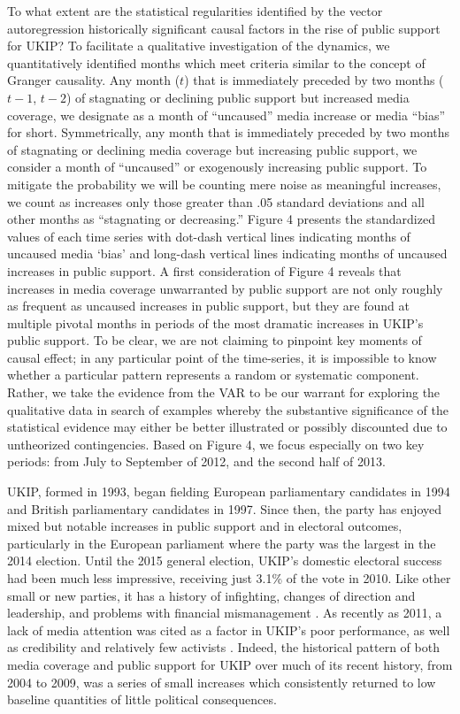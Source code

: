 \documentclass[12pt,]{article}
\begin{document}
To what extent are the statistical regularities identified by the vector
autoregression historically significant causal factors in the rise of
public support for UKIP? To facilitate a qualitative investigation of
the dynamics, we quantitatively identified months which meet criteria
similar to the concept of Granger causality. Any month (\(t\)) that is
immediately preceded by two months (\(t-1\), \(t-2\)) of stagnating or
declining public support but increased media coverage, we designate as a
month of ``uncaused'' media increase or media ``bias'' for short.
Symmetrically, any month that is immediately preceded by two months of
stagnating or declining media coverage but increasing public support, we
consider a month of ``uncaused'' or exogenously increasing public
support. To mitigate the probability we will be counting mere noise as
meaningful increases, we count as increases only those greater than .05
standard deviations and all other months as ``stagnating or
decreasing.'' Figure 4 presents the standardized values of each time
series with dot-dash vertical lines indicating months of uncaused media
`bias' and long-dash vertical lines indicating months of uncaused
increases in public support. A first consideration of Figure 4 reveals
that increases in media coverage unwarranted by public support are not
only roughly as frequent as uncaused increases in public support, but
they are found at multiple pivotal months in periods of the most
dramatic increases in UKIP's public support. To be clear, we are not
claiming to pinpoint key moments of causal effect; in any particular
point of the time-series, it is impossible to know whether a particular
pattern represents a random or systematic component. Rather, we take the
evidence from the VAR to be our warrant for exploring the qualitative
data in search of examples whereby the substantive significance of the
statistical evidence may either be better illustrated or possibly
discounted due to untheorized contingencies. Based on Figure 4, we focus
especially on two key periods: from July to September of 2012, and the
second half of 2013.

UKIP, formed in 1993, began fielding European parliamentary candidates
in 1994 and British parliamentary candidates in 1997. Since then, the
party has enjoyed mixed but notable increases in public support and in
electoral outcomes, particularly in the European parliament where the
party was the largest in the 2014 election. Until the 2015 general
election, UKIP's domestic electoral success had been much less
impressive, receiving just 3.1\% of the vote in 2010. Like other small
or new parties, it has a history of infighting, changes of direction and
leadership, and problems with financial mismanagement
\citep{Whitaker:2011gi}. As recently as 2011, a lack of media attention
was cited as a factor in UKIP's poor performance, as well as credibility
and relatively few activists \citep{ford_strategic_2012}. Indeed, the
historical pattern of both media coverage and public support for UKIP
over much of its recent history, from 2004 to 2009, was a series of
small increases which consistently returned to low baseline quantities
of little political consequences.
\end{document}
